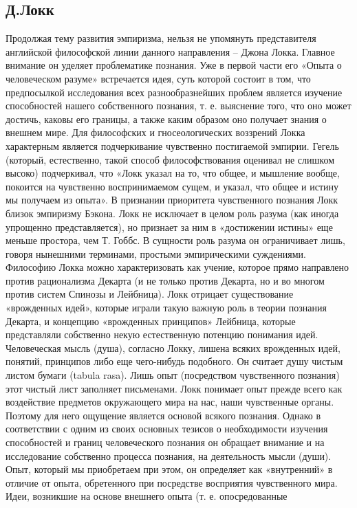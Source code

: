 \documentclass[12pt]{article}
\begin{document}
\subsection{Д.Локк}
Продолжая тему развития эмпиризма, нельзя не упомянуть представителя английской философской линии
данного направления – Джона Локка. Главное внимание он уделяет проблематике познания. Уже в первой части
его «Опыта о человеческом разуме» встречается идея, суть которой состоит в том, что предпосылкой
исследования всех разнообразнейших проблем является изучение способностей нашего собственного познания,
т. е. выяснение того, что оно может достичь, каковы его границы, а также каким образом оно получает знания о
внешнем мире.
Для философских и гносеологических воззрений Локка характерным является подчеркивание чувственно
постигаемой эмпирии. Гегель (который, естественно, такой способ философствования оценивал не слишком
высоко) подчеркивал, что «Локк указал на то, что общее, и мышление вообще, покоится на чувственно
воспринимаемом сущем, и указал, что общее и истину мы получаем из опыта». В признании приоритета
чувственного познания Локк близок эмпиризму Бэкона.
Локк не исключает в целом роль разума (как иногда упрощенно представляется), но признает за ним в
«достижении истины» еще меньше простора, чем Т. Гоббс. В сущности роль разума он ограничивает лишь,
говоря нынешними терминами, простыми эмпирическими суждениями.
Философию Локка можно характеризовать как учение, которое прямо направлено против рационализма Декарта
(и не только против Декарта, но и во многом против систем Спинозы и Лейбница). Локк отрицает
существование «врожденных идей», которые играли такую важную роль в теории познания Декарта, и концепцию
«врожденных принципов» Лейбница, которые представляли собственно некую естественную потенцию
понимания идей.
Человеческая мысль (душа), согласно Локку, лишена всяких врожденных идей, понятий, принципов либо еще
чего-нибудь подобного. Он считает душу чистым листом бумаги (tabula rasa). Лишь опыт (посредством
чувственного познания) этот чистый лист заполняет письменами.
Локк понимает опыт прежде всего как воздействие предметов окружающего мира на нас, наши чувственные 
органы. Поэтому для него ощущение является основой всякого познания. Однако в соответствии с одним из
своих основных тезисов о необходимости изучения способностей и границ человеческого познания он
обращает внимание и на исследование собственно процесса познания, на деятельность мысли (души). Опыт,
который мы приобретаем при этом, он определяет как «внутренний» в отличие от опыта, обретенного при
посредстве восприятия чувственного мира. Идеи, возникшие на основе внешнего опыта (т. е. опосредованные
\end{document}
